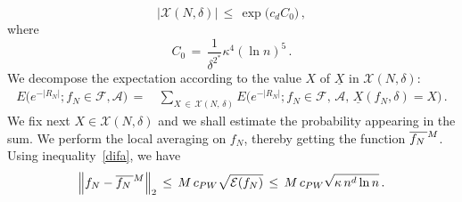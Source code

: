 \documentclass[10pt]{amsart}
\theoremstyle{definition}\newtheorem{defi}[theo]{Definition}\newtheorem{rema}[theo]{Remark}\newtheorem{exam}[theo]{Example}\newtheorem{exem}[theo]{Example}\newtheorem{nota}[theo]{Notation}
\newcommand{\XX}{{\underline{X}}}
\newcommand*\fmn{\overline{f_N\,}^{\lower2pt\hbox{$\scriptstyle M$}}}
\newcommand{\cA}{\mathcal{A}}
\newcommand{\cE}{\mathcal{E}}
\newcommand{\cF}{\mathcal{F}}
\newcommand{\cX}{\mathcal{X}}
\begin{document}
\begin{equation}\label{siq}
\big|
\cX(N,\delta)
\big|\,\leq\,
\exp\big(c_dC_0\big)
\,,
\end{equation}
where
\begin{equation}\label{saq}
C_0\,=\,
\frac{1} { \delta^{2^*}}
\kappa^4(\ln n)^{5}\,.
\end{equation}
We decompose the expectation according to the value $X$ of $\XX$ in $\cX(N,\delta)$:
\begin{align}\label{suma}
E\big(e^{-|R_N|}; f_N\in\cF,\cA)\,=\,&
\sum_{X\,\in\,\cX(N,\,\delta)} E\big(e^{-|R_N|}; f_N\in\cF,\,\cA,\,\XX(f_N,\delta)=X\big)\,.
\end{align}
We fix next ${X\in \cX(N,\delta)}$ and we shall estimate the probability appearing in the sum. We perform the local averaging on $f_N$, thereby getting the function $\fmn$. Using inequality~\eqref{difa}, we have
\begin{equation}\label{dba}
\left\|f_N-\fmn\right\|_2
\,\leq\,M\,c_{PW}
\sqrt{\cE(f_N)}
\,\leq\,M\,c_{PW}
\sqrt{\kappa \,n^d\ln n}
\,.
\end{equation}
\end{document}
